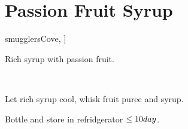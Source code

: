 \section{Passion Fruit Syrup}\label{passionFruitSyrup}


\begin{recipestats}[
	servings=3~$C$,
	preptime=10~\minute,
	original=\citeauthor{smugglersCove}~\cite[p.~325]{smugglersCove},
]
\end{recipestats}

\begin{recipeabstract}
	Rich syrup with passion fruit.
\end{recipeabstract}


\begin{ingredientcolumns}[1]
	\begin{ingredientblock}
		\\
	\end{ingredientblock}
\end{ingredientcolumns}


\begin{preparation}
	\item Let rich syrup cool, whisk fruit puree and syrup.
	\item Bottle and store in refridgerator $\le 10 day$.
\end{preparation}


\recipeend%
